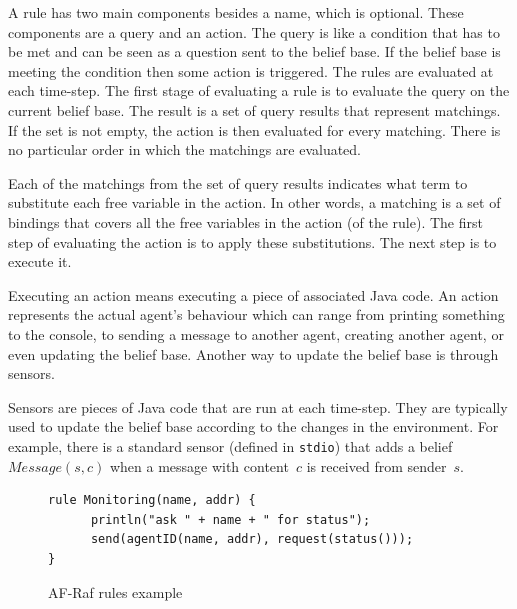 \documentclass[a4paper,12pt,oneside,fleqn]{book} %
\begin{document}
A rule has two main components besides a name, which is optional. These
components are a query and an action. The query is like a condition that
has to be met and can be seen as a question sent to the belief base. If the
belief base is meeting the condition then some action is triggered. The
rules are evaluated at each time-step. The first stage of evaluating a rule
is to evaluate the query on the current belief base. The result is a set of
query results that represent matchings. If the set is not empty, the
action is then evaluated for every matching. There is no particular order
in which the matchings are evaluated. 

Each of the matchings from the set of query results indicates what term
to substitute each free variable in the action. In other words, a matching
is a set of bindings that covers all the free variables in the action (of
the rule). The first step of evaluating the action is to apply these
substitutions. The next step is to execute it.

Executing an action means executing a piece of associated Java code.
An action represents the actual agent's behaviour which can
range from printing something to the console, to sending a message to
another agent, creating another agent, or even updating the belief base.
Another way to update the belief base is through sensors.

Sensors are pieces of Java code that are run at each time-step. They are
typically used to update the belief base according to the changes in the
environment. For example, there is a standard sensor (defined in
\texttt{stdio}) that adds a belief $\mathit{Message}(s,c)$ when a message
with content~$c$ is received from sender~$s$.



\begin{figure}\footnotesize %
\begin{verbatim}
rule Monitoring(name, addr) {
      println("ask " + name + " for status");
      send(agentID(name, addr), request(status()));
}
\end{verbatim}
\caption{AF-Raf rules example}
\label{fig:rule}
\end{figure} %
\end{document}
